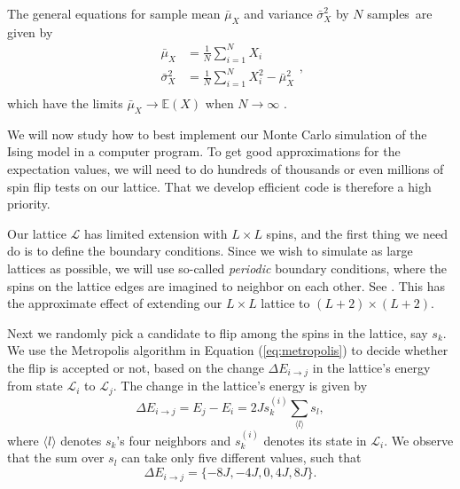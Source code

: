 \documentclass[]{article}
\begin{document}
The general equations for sample mean $\bar{\mu}_X$ and variance $\bar{\sigma}^2_X$ by $N$ samples are given by
\begin{equation}
\begin{aligned}
	\bar{\mu}_X &= \frac{1}{N} \sum_{i=1}^{N} X_i \\
	\bar{\sigma}^2_X &= \frac{1}{N} \sum_{i=1}^{N} X^2_i - \bar{\mu}^2_X \\
\end{aligned},
\end{equation}
which have the limits $\bar{\mu}_X \rightarrow \mathbb{E}(X)$ when $N \rightarrow \infty$ \cite{fys-stk4155-notes}.

\vspace{5mm}

We will now study how to best implement our Monte Carlo simulation of the Ising model in a computer program. To get good approximations for the expectation values, we will need to do hundreds of thousands or even millions of spin flip tests on our lattice. That we develop efficient code is therefore a high priority.

Our lattice $\mathcal{L}$ has limited extension with $L \times L$ spins, and the first thing we need do is to define the boundary conditions. Since we wish to simulate as large lattices as possible, we will use so-called \textit{periodic} boundary conditions, where the spins on the lattice edges are imagined to neighbor on each other. See \cite{fys4150-notes}. This has the approximate effect of extending our $L \times L$ lattice to $(L+2) \times (L+2)$.

Next we randomly pick a candidate to flip among the spins in the lattice, say $s_k$. We use the Metropolis algorithm in Equation (\ref{eq:metropolis}) to decide whether the flip is accepted or not, based on the change $\Delta E_{i \rightarrow j}$ in the lattice's energy from state $\mathcal{L}_i$ to $\mathcal{L}_j$. The change in the lattice's energy is given by
\begin{equation} \label{eq:dE}
	\Delta E_{i \rightarrow j} = E_j - E_i = 2J s_k^{(i)} \sum_{\langle l \rangle} s_l,
\end{equation}
where $\langle l \rangle$ denotes $s_k$'s four neighbors and $s_k^{(i)}$ denotes its state in $\mathcal{L}_i$. We observe that the sum over $s_l$ can take only five different values, such that
\begin{equation}
	\Delta E_{i \rightarrow j} = \{-8J, -4J, 0, 4J, 8J \}.
\end{equation}
\end{document}
